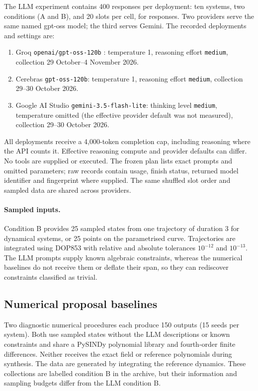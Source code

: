 \documentclass[10pt]{article}
\begin{document}
The LLM experiment contains 400 responses per deployment: ten systems, two conditions (A and B), and 20 slots per cell, for \nLLM{} responses. Two providers serve the same named gpt-oss model; the third serves Gemini. The recorded deployments and settings are:
\begin{enumerate}[label=(\roman*),leftmargin=*]
\item Groq \texttt{openai/gpt-oss-120b} \citep{openai-gpt-oss}: temperature 1, reasoning effort \texttt{medium}, collection 29 October--4 November 2026.
\item Cerebras \texttt{gpt-oss-120b}: temperature 1, reasoning effort \texttt{medium}, collection 29--30 October 2026.
\item Google AI Studio \texttt{gemini-3.5-flash-lite}: thinking level \texttt{medium}, temperature omitted (the effective provider default was not measured), collection 29--30 October 2026.
\end{enumerate}
All deployments receive a 4,000-token completion cap, including reasoning where the API counts it. Effective reasoning compute and provider defaults can differ. No tools are supplied or executed. The frozen plan lists exact prompts and omitted parameters; raw records contain usage, finish status, returned model identifier and fingerprint where supplied. The same shuffled slot order and sampled data are shared across providers.

\paragraph{Sampled inputs.} Condition B provides 25 sampled states from one trajectory of duration 3 for dynamical systems, or 25 points on the parametrised curve. Trajectories are integrated using DOP853 with relative and absolute tolerances $10^{-12}$ and $10^{-13}$. The LLM prompts supply known algebraic constraints, whereas the numerical baselines do not receive them or deflate their span, so they can rediscover constraints classified as trivial.

\subsection{Numerical proposal baselines}\label{sec:numerical-baselines}

Two diagnostic numerical procedures each produce 150 outputs (15 seeds per system). Both use sampled states without the LLM descriptions or known constraints and share a PySINDy polynomial library and fourth-order finite differences. Neither receives the exact field or reference polynomials during synthesis. The data are generated by integrating the reference dynamics. These collections are labelled condition B in the archive, but their information and sampling budgets differ from the LLM condition B.
\end{document}
